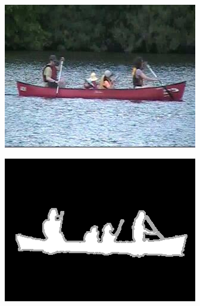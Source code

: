\begin{figure}[!htb]
\centering
\begin{subfigure}[b]{0.3\textwidth}
\includegraphics[width=\textwidth]{img/segIn}
\caption{\label{fig:segIn}}
\end{subfigure}
\quad
\begin{subfigure}[b]{0.3\textwidth}
\includegraphics[width=\textwidth]{img/segGt}
\caption{\label{fig:segGt}}
\end{subfigure}
\quad
\begin{subfigure}[b]{0.3\textwidth}

\end{subfigure}
\end{figure}

